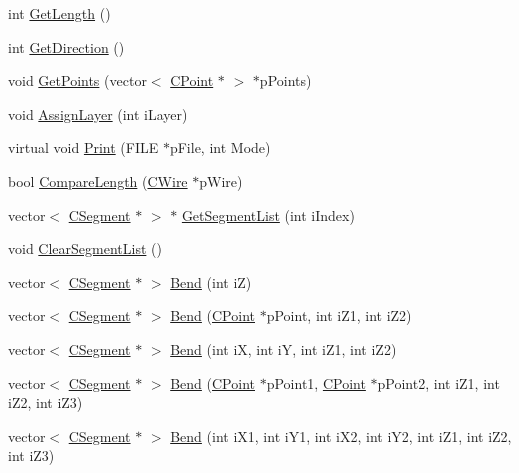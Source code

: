 \begin{DoxyCompactItemize}
\item 
int \mbox{\hyperlink{classCWire_a063474510062c4cd858fb5bfc04daffb}{Get\+Length}} ()
\item 
int \mbox{\hyperlink{classCWire_a737e918e2752d29ef32db9bc4648cb90}{Get\+Direction}} ()
\item 
void \mbox{\hyperlink{classCWire_a4799d4eeedb42ab2961ca93f25740368}{Get\+Points}} (vector$<$ \mbox{\hyperlink{classCPoint}{C\+Point}} $\ast$ $>$ $\ast$p\+Points)
\item 
void \mbox{\hyperlink{classCWire_a6d114fa68a8539380b0231f5d2d1a10a}{Assign\+Layer}} (int i\+Layer)
\item 
virtual void \mbox{\hyperlink{classCWire_a76b2e23a425ddd51f02f41ba2caf3134}{Print}} (F\+I\+LE $\ast$p\+File, int Mode)
\item 
bool \mbox{\hyperlink{classCWire_a683449c62b5625b17a78f12274d4a601}{Compare\+Length}} (\mbox{\hyperlink{classCWire}{C\+Wire}} $\ast$p\+Wire)
\item 
vector$<$ \mbox{\hyperlink{classCSegment}{C\+Segment}} $\ast$ $>$ $\ast$ \mbox{\hyperlink{classCWire_afab000638f87557894a8588f16ad0df4}{Get\+Segment\+List}} (int i\+Index)
\item 
void \mbox{\hyperlink{classCWire_a1d2f3795ad3fb276a22eaf5a10b89a36}{Clear\+Segment\+List}} ()
\item 
vector$<$ \mbox{\hyperlink{classCSegment}{C\+Segment}} $\ast$ $>$ \mbox{\hyperlink{classCWire_a5d543b640c15704e505c6b8c952f9f5d}{Bend}} (int iZ)
\item 
vector$<$ \mbox{\hyperlink{classCSegment}{C\+Segment}} $\ast$ $>$ \mbox{\hyperlink{classCWire_ae0e5ba6466563b569c4a958f8d716b99}{Bend}} (\mbox{\hyperlink{classCPoint}{C\+Point}} $\ast$p\+Point, int i\+Z1, int i\+Z2)
\item 
vector$<$ \mbox{\hyperlink{classCSegment}{C\+Segment}} $\ast$ $>$ \mbox{\hyperlink{classCWire_a1eb748fc072c27d1f1da942efe109823}{Bend}} (int iX, int iY, int i\+Z1, int i\+Z2)
\item 
vector$<$ \mbox{\hyperlink{classCSegment}{C\+Segment}} $\ast$ $>$ \mbox{\hyperlink{classCWire_a5e7f3f872777c728db89921f49bef82c}{Bend}} (\mbox{\hyperlink{classCPoint}{C\+Point}} $\ast$p\+Point1, \mbox{\hyperlink{classCPoint}{C\+Point}} $\ast$p\+Point2, int i\+Z1, int i\+Z2, int i\+Z3)
\item 
vector$<$ \mbox{\hyperlink{classCSegment}{C\+Segment}} $\ast$ $>$ \mbox{\hyperlink{classCWire_a1ffc3243c96850451394c2b121705585}{Bend}} (int i\+X1, int i\+Y1, int i\+X2, int i\+Y2, int i\+Z1, int i\+Z2, int i\+Z3)

\end{DoxyCompactItemize}
